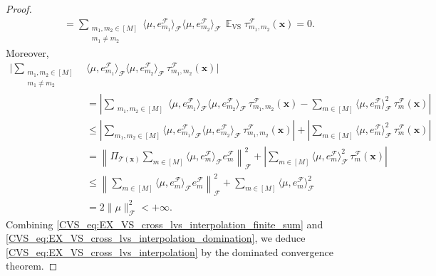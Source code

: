 \documentclass[twoside,11pt]{book}
\numberwithin{theorem}{chapter}
\numberwithin{definition}{chapter}
\numberwithin{proposition}{chapter}
\numberwithin{corollary}{chapter}
\numberwithin{example}{chapter}
\numberwithin{lemma}{chapter}
\numberwithin{assumption}{chapter}
\numberwithin{equation}{chapter}
\numberwithin{figure}{chapter}
\DeclareMathOperator{\VS}{\mathrm{VS}}
\DeclareMathOperator{\EX}{\mathbb{E}}
\DeclareMathOperator{\F}{\mathcal{F}}
\begin{document}
\begin{proof}
\begin{align}
& =  \sum\limits_{\substack{m_{1},m_{2} \in [M] \\ m_{1} \neq m_{2}}}  \langle \mu, e_{m_{1}}^{\F} \rangle_{\F} \langle \mu, e_{m_{2}}^{\F} \rangle_{\F} \,\EX_{\VS} \tau_{m_{1},m_{2}}^{\F}(\bm{x}) = 0.
\label{CVS_eq:EX_VS_cross_lvs_interpolation_finite_sum}
\end{align}
Moreover,
\begin{align}
\Bigg\vert\sum\limits_{\substack{m_{1},m_{2} \in [M] \\ m_{1} \neq m_{2}}}  &\langle \mu, e_{m_{1}}^{\F} \rangle_{\F} \langle \mu, e_{m_{2}}^{\F} \rangle_{\F} \,\tau_{m_{1},m_{2}}^{\F}(\bm{x})\Bigg\vert\nonumber \\
& = \left|\sum\limits_{\substack{m_{1},m_{2} \in [M]}}  \langle \mu, e_{m_{1}}^{\F} \rangle_{\F} \langle \mu, e_{m_{2}}^{\F} \rangle_{\F} \,\tau_{m_{1},m_{2}}^{\F}(\bm{x}) - \sum\limits_{m \in [M]} \langle \mu, e_{m}^{\F} \rangle_{\F}^{2} \,\tau_{m}^{\F}(\bm{x})\right|  \nonumber\\
 & \leq \left|\sum\limits_{m_{1},m_{2} \in [M]}  \langle \mu, e_{m_{1}}^{\F} \rangle_{\F} \langle \mu, e_{m_{2}}^{\F} \rangle_{\F} \,\tau_{m_{1},m_{2}}^{\F}(\bm{x})\right|
 +  \left|\sum\limits_{m \in [M]} \langle \mu, e_{m}^{\F} \rangle_{\F}^{2} \,\tau_{m}^{\F}(\bm{x})\right| \nonumber\\
& = \left\| \Pi_{\mathcal{T}(\bm{x})} \sum\limits_{m \in [M]} \langle \mu, e_{m}^{\F} \rangle_{\F} e_{m}^{\F}\right\|_{\F}^{2}  +  \left|\sum\limits_{m \in [M]} \langle \mu, e_{m}^{\F} \rangle_{\F}^{2} \,\tau_{m}^{\F}(\bm{x})\right| \nonumber\\
& \leq \left\|\sum\limits_{m \in [M]} \langle \mu, e_{m}^{\F} \rangle_{\F} e_{m}^{\F}\right\|_{\F}^{2}  +  \sum\limits_{m \in [M]} \langle \mu, e_{m}^{\F} \rangle_{\F}^{2} \nonumber \\
& = 2 \|\mu\|_{\F}^{2} < +\infty.
\label{CVS_eq:EX_VS_cross_lvs_interpolation_domination}
\end{align}
Combining \eqref{CVS_eq:EX_VS_cross_lvs_interpolation_finite_sum} and \eqref{CVS_eq:EX_VS_cross_lvs_interpolation_domination}, we deduce \eqref{CVS_eq:EX_VS_cross_lvs_interpolation} by the dominated convergence theorem.


\end{proof}
\end{document}
